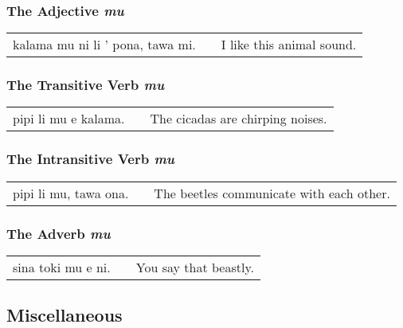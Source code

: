 \subsubsection*{The Adjective  \textit{mu}}

\begin{supertabular}{p{5,5cm}|ll}
kalama mu ni li ' pona, tawa mi. && I like this animal sound.\\
\end{supertabular} 

%
\subsubsection*{The Transitive Verb \textit{mu}}

\begin{supertabular}{p{5,5cm}|ll}
pipi li mu e kalama. && The cicadas are chirping noises.  \\
\end{supertabular} 

%
\subsubsection*{The Intransitive Verb \textit{mu}}

\begin{supertabular}{p{5,5cm}|ll}
pipi li mu, tawa ona. && The beetles communicate with each other. \\
\end{supertabular} 

%
\subsubsection*{The Adverb \textit{mu}}

\begin{supertabular}{p{5,5cm}|ll}
sina toki mu e ni. && You say that beastly. \\
\end{supertabular} 

%
%
%
%
%
\subsection*{Miscellaneous}
%
%
%
%
